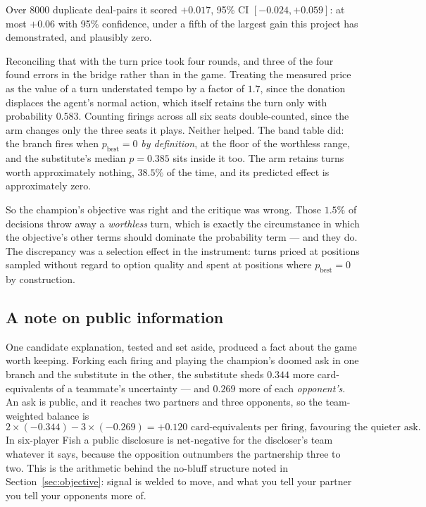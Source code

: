 \documentclass[11pt,a4paper]{article}
\begin{document}
Over $8000$ duplicate deal-pairs it scored $+0.017$, 95\% CI
$[-0.024, +0.059]$: at most $+0.06$ with 95\% confidence, under a fifth of the
largest gain this project has demonstrated, and plausibly zero.

Reconciling that with the turn price took four rounds, and three of the four
found errors in the bridge rather than in the game. Treating the measured price
as the value of a turn understated tempo by a factor of $1.7$, since the
donation displaces the agent's normal action, which itself retains the turn
only with probability $0.583$. Counting firings across all six seats
double-counted, since the arm changes only the three seats it plays. Neither
helped. The band table did: the branch fires when $p_{\text{best}} = 0$
\emph{by definition}, at the floor of the worthless range, and the substitute's
median $p = 0.385$ sits inside it too. The arm retains turns worth
approximately nothing, $38.5\%$ of the time, and its predicted effect is
approximately zero.

So the champion's objective was right and the critique was wrong. Those $1.5\%$
of decisions throw away a \emph{worthless} turn, which is exactly the
circumstance in which the objective's other terms should dominate the
probability term --- and they do. The discrepancy was a selection effect in the
instrument: turns priced at positions sampled without regard to option quality
and spent at positions where $p_{\text{best}} = 0$ by construction.

\subsection{A note on public information}

One candidate explanation, tested and set aside, produced a fact about the game
worth keeping. Forking each firing and playing the champion's doomed ask in one
branch and the substitute in the other, the substitute sheds $0.344$ more
card-equivalents of a teammate's uncertainty --- and $0.269$ more of each
\emph{opponent's}. An ask is public, and it reaches two partners and three
opponents, so the team-weighted balance is
\[
2 \times (-0.344) - 3 \times (-0.269) = +0.120 \text{ card-equivalents per
firing, favouring the quieter ask.}
\]
In six-player Fish a public disclosure is net-negative for the discloser's team
whatever it says, because the opposition outnumbers the partnership three to
two. This is the arithmetic behind the no-bluff structure noted in
Section~\ref{sec:objective}: signal is welded to move, and what you tell your
partner you tell your opponents more of.
\end{document}
